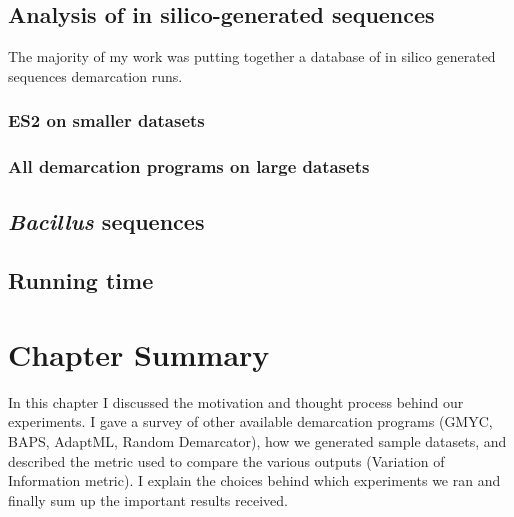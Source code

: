 \subsection*{Analysis of in silico-generated sequences}
The majority of my work was putting together a database of in silico generated sequences demarcation runs.
\subsubsection*{ES2 on smaller datasets}
\subsubsection*{All demarcation programs on large datasets}
\subsection*{\emph{Bacillus} sequences}
\subsection*{Running time}
\section{Chapter Summary}
In this chapter I discussed the motivation and thought process behind our experiments.
I gave a survey of other available demarcation programs (GMYC, BAPS, AdaptML, Random Demarcator), how we generated sample datasets, and described the metric used to compare the various outputs (Variation of Information metric).
I explain the choices behind which experiments we ran and finally sum up the important results received.






